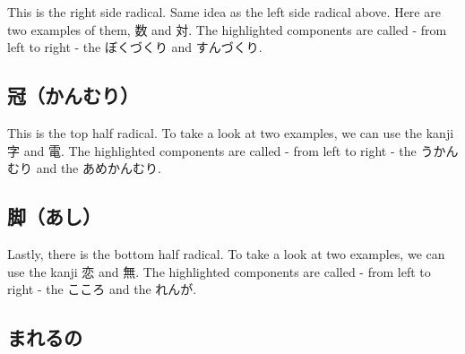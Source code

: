 This is the right side radical. Same idea as the left side radical above. Here are two examples of them, 数 and 対. The highlighted components are called - from left to right - the ぼくづくり and すんづくり.

\begin{figure}[H]\label{fig:PR;漢字;部首;つくり}
	\centering
	
	\hspace{0.5in}
	
\end{figure}

\subsection*{冠（かんむり）}\label{ssec:PR;漢字;部首;かんむり}

This is the top half radical. To take a look at two examples, we can use the kanji 字 and 電. The highlighted components are called - from left to right - the うかんむり and the あめかんむり. 

\begin{figure}[H]\label{fig:PR;漢字;部首;かんむり}
	\centering
	
	\hspace{0.5in}
	
\end{figure}

\subsection*{脚（あし）}\label{ssec:PR;漢字;部首;あし}

Lastly, there is the bottom half radical. To take a look at two examples, we can use the kanji 恋 and 無. The highlighted components are called - from left to right - the こころ and the れんが.

\begin{figure}[H]\label{fig:PR;漢字;部首;あし}
	\centering
	
	\hspace{0.5in}
	
\end{figure}

\subsection*{まれるの}\label{ssec:PR;漢字;部首;囲まれるの部首}


